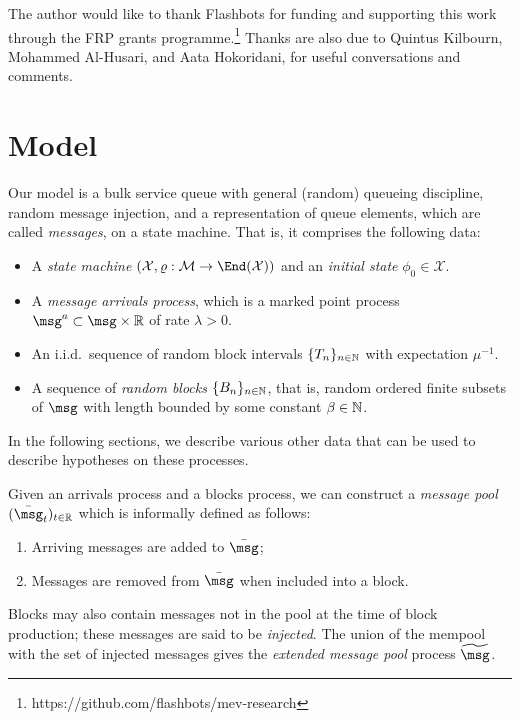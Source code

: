 \documentclass[a4paper,11pt]{article}
\begin{document}
The author would like to thank Flashbots for funding and supporting this work through the FRP grants programme.\footnote{https://github.com/flashbots/mev-research} Thanks are also due to Quintus Kilbourn, Mohammed Al-Husari, and Aata Hokoridani, for useful conversations and comments.

\section{Model}

Our model is a bulk service queue with general (random) queueing discipline, random message injection, and a representation of queue elements, which are called \emph{messages}, on a state machine. That is, it comprises the following data:
%
\begin{itemize}

  \item
    A \emph{state machine} $(\mathcal{X},\varrho:\mathcal{M}\rightarrow\End(\mathcal{X}))$ and an \emph{initial state} $\phi_0\in\mathcal{X}$.
    
  \item
    A \emph{message arrivals process}, which is a marked point process $\msg^a\subset\msg\times\R$ of rate $\lambda>0$.
    
  \item
    An i.i.d.~sequence of random block intervals $\{T_n\}_{n\in\mathbb N}$ with expectation $\mu^{-1}$.
    
  \item
    A sequence of \emph{random blocks} $\{B_n\}_{n\in\mathbb N}$, that is, random ordered finite subsets of $\msg$ with length bounded by some constant $\beta\in\mathbb N$.
    
\end{itemize}
%
In the following sections, we describe various  other data that can be used to describe hypotheses on these processes.

Given an arrivals process and a blocks process, we can construct a \emph{message pool} $(\bar\msg_t)_{t\in\R}$ which is informally defined as follows:
\begin{enumerate}
\item Arriving messages are added to $\bar{\msg}$;
\item Messages are removed from $\bar\msg$ when included into a block.
\end{enumerate}
Blocks may also contain messages not in the pool at the time of block production; these messages are said to be \emph{injected}.
%
The union of the mempool with the set of injected messages gives the \emph{extended message pool} process $\widetilde\msg$.
\end{document}
